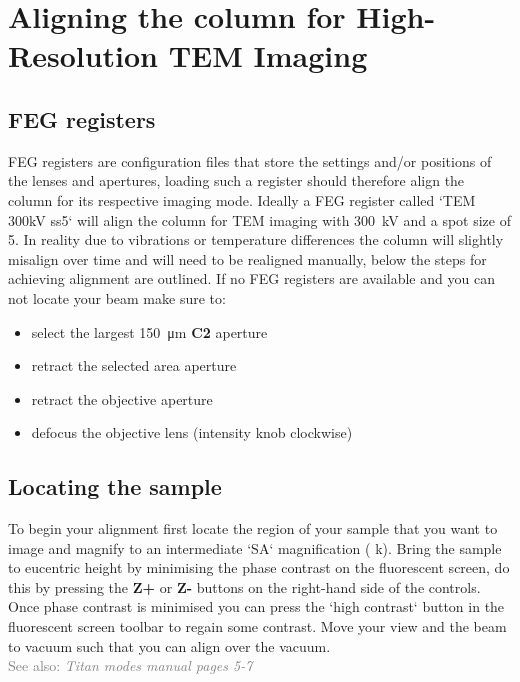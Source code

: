 \documentclass[a4paper]{scrartcl}
\begin{document}
\section*{Aligning the column for High-Resolution TEM Imaging}
\subsection*{FEG registers}
FEG registers are configuration files that store the settings and/or positions of the lenses and apertures, loading such a register should therefore align the column for its respective imaging mode. Ideally a FEG register called `TEM 300kV ss5` will align the column for TEM imaging with \SI{300}{\kilo \volt} and a spot size of 5. In reality due to vibrations or temperature differences the column will slightly misalign over time and will need to be realigned manually, below the steps for achieving alignment are outlined. If no FEG registers are available and you can not locate your beam make sure to:
\begin{itemize}
	\item select the largest \SI{150}{\micro\meter} \textbf{C2} aperture 	
	\item retract the selected area aperture
	\item retract the objective aperture
	\item defocus the objective lens (intensity knob clockwise)
\end{itemize}

\subsection*{Locating the sample}
To begin your alignment first locate the region of your sample that you want to image and magnify to an intermediate `SA` magnification ( k\times). Bring the sample to eucentric height by minimising the phase contrast on the fluorescent screen, do this by pressing the \textbf{Z+} or \textbf{Z-} buttons on the right-hand side of the controls. Once phase contrast is minimised you can press the `high contrast` button in the fluorescent screen toolbar to regain some contrast. Move your view and the beam to vacuum such that you can align over the vacuum.\\
\textcolor{gray}{See also: \textit{Titan modes manual pages 5-7}}
\end{document}
